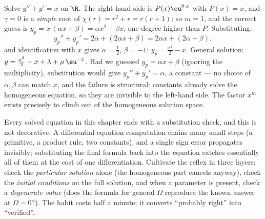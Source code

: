 \begin{example}\label{ex:b1:diffeq:multiplicity}
Solve $y'' + y' = x$ on $\R$. The right-hand side is $P(x)\eu^{0
\cdot x}$ with $P(x) = x$, and $\gamma = 0$ is a \emph{simple} root
of $\chi(r) = r^2 + r = r(r + 1)$: so $m = 1$, and the correct
guess is $y_p = x\,(\alpha x + \beta) = \alpha x^2 + \beta x$, one
degree higher than $P$. Substituting:
\[
y_p'' + y_p' = 2\alpha + (2\alpha x + \beta)
= 2\alpha x + (2\alpha + \beta) ,
\]
and identification with $x$ gives $\alpha = \frac12$, $\beta = -1$:
$y_p = \frac{x^2}2 - x$. General solution: $y = \frac{x^2}2 - x +
\lambda + \mu\,\eu^{-x}$. Had we guessed $y_p = \alpha x + \beta$
(ignoring the multiplicity), substitution would give $y_p'' + y_p'
= \alpha$, a constant --- no choice of $\alpha, \beta$ can match
$x$, and the failure is structural: constants already solve the
homogeneous equation, so they are invisible to the left-hand side.
The factor $x^m$ exists precisely to climb out of the homogeneous
solution space.
\end{example}

\begin{remark}\label{rem:b1:diffeq:check}
Every solved equation in this chapter ends with a substitution
check, and this is not decorative. A differential-equation
computation chains many small steps (a primitive, a product rule,
two constants), and a single sign error propagates invisibly;
substituting the final formula back into the equation catches
essentially all of them at the cost of one differentiation.
Cultivate the reflex in three layers: check the \emph{particular
solution} alone (the homogeneous part cancels anyway), check the
\emph{initial conditions} on the full solution, and when a
parameter is present, check a \emph{degenerate value} (does the
formula for general $\Omega$ reproduce the known answer at
$\Omega = 0$?). The habit costs half a minute; it converts
``probably right'' into ``verified''.
\end{remark}

